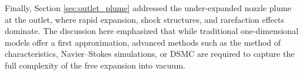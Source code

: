 Finally, Section \ref{sec:outlet_plume} addressed the under-expanded nozzle plume at the outlet, where rapid expansion, shock structures, and rarefaction effects dominate.
The discussion here emphasized that while traditional one-dimensional models offer a first approximation, advanced methods such as the method of characteristics, Navier–Stokes simulations, or DSMC are required to capture the full complexity of the free expansion into vacuum.

\newpage
